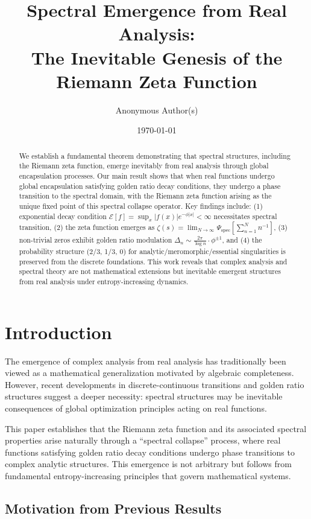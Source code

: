 \documentclass[12pt]{article}
\title{Spectral Emergence from Real Analysis: \\The Inevitable Genesis of the Riemann Zeta Function}
\author{Anonymous Author(s)}
\date{\today}
\theoremstyle{plain}
\theoremstyle{definition}
\begin{document}
\maketitle

\begin{abstract}
We establish a fundamental theorem demonstrating that spectral structures, including the Riemann zeta function, emerge inevitably from real analysis through global encapsulation processes. Our main result shows that when real functions undergo global encapsulation satisfying golden ratio decay conditions, they undergo a phase transition to the spectral domain, with the Riemann zeta function arising as the unique fixed point of this spectral collapse operator. Key findings include: (1) exponential decay condition $\mathcal{E}[f] = \sup_x |f(x)| e^{-\phi|x|} < \infty$ necessitates spectral transition, (2) the zeta function emerges as $\zeta(s) = \lim_{N \to \infty} \Psi_{\text{spec}}[\sum_{n=1}^N n^{-1}]$, (3) non-trivial zeros exhibit golden ratio modulation $\Delta_n \sim \frac{2\pi}{\log n} \cdot \phi^{\pm 1}$, and (4) the probability structure (2/3, 1/3, 0) for analytic/meromorphic/essential singularities is preserved from the discrete foundations. This work reveals that complex analysis and spectral theory are not mathematical extensions but inevitable emergent structures from real analysis under entropy-increasing dynamics.
\end{abstract}

\section{Introduction}

The emergence of complex analysis from real analysis has traditionally been viewed as a mathematical generalization motivated by algebraic completeness. However, recent developments in discrete-continuous transitions and golden ratio structures suggest a deeper necessity: spectral structures may be inevitable consequences of global optimization principles acting on real functions.

This paper establishes that the Riemann zeta function and its associated spectral properties arise naturally through a ``spectral collapse'' process, where real functions satisfying golden ratio decay conditions undergo phase transitions to complex analytic structures. This emergence is not arbitrary but follows from fundamental entropy-increasing principles that govern mathematical systems.

\subsection{Motivation from Previous Results}
\end{document}

